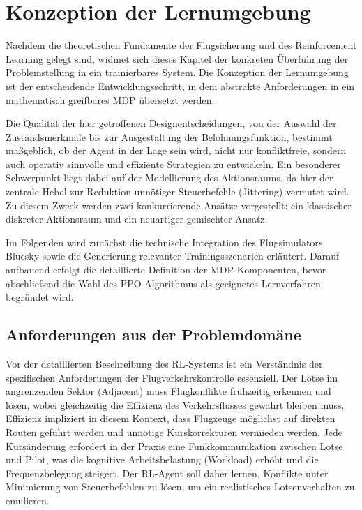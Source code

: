 \chapter{Konzeption der Lernumgebung}
\label{ch:konzeption}

Nachdem die theoretischen Fundamente der Flugsicherung und des Reinforcement Learning gelegt sind, widmet sich dieses Kapitel der konkreten Überführung der Problemstellung in ein trainierbares System. Die Konzeption der Lernumgebung ist der entscheidende Entwicklungsschritt, in dem abstrakte Anforderungen in ein mathematisch greifbares \ac{MDP} übersetzt werden.
\medskip

Die Qualität der hier getroffenen Designentscheidungen, von der Auswahl der Zustandsmerkmale bis zur Ausgestaltung der Belohnungsfunktion, bestimmt maßgeblich, ob der Agent in der Lage sein wird, nicht nur konfliktfreie, sondern auch operativ sinnvolle und effiziente Strategien zu entwickeln. Ein besonderer Schwerpunkt liegt dabei auf der Modellierung des Aktionsraums, da hier der zentrale Hebel zur Reduktion unnötiger Steuerbefehle (Jittering) vermutet wird. Zu diesem Zweck werden zwei konkurrierende Ansätze vorgestellt: ein klassischer diskreter Aktionsraum und ein neuartiger gemischter Ansatz.
\medskip

Im Folgenden wird zunächst die technische Integration des Flugsimulators Bluesky sowie die Generierung relevanter Trainingsszenarien erläutert. Darauf aufbauend erfolgt die detaillierte Definition der \ac{MDP}-Komponenten, bevor abschließend die Wahl des \ac{PPO}-Algorithmus als geeignetes Lernverfahren begründet wird.

\section{Anforderungen aus der Problemdomäne}
Vor der detaillierten Beschreibung des \ac{RL}\hyp{}Systems ist ein Verständnis der spezifischen Anforderungen der Flugverkehrskontrolle essenziell. 
Der Lotse im angrenzenden Sektor (Adjacent) muss Flugkonflikte frühzeitig erkennen und lösen, wobei gleichzeitig die Effizienz des Verkehrsflusses gewahrt bleiben muss.
Effizienz impliziert in diesem Kontext, dass Flugzeuge möglichst auf direkten Routen geführt werden und unnötige Kurskorrekturen vermieden werden.
Jede Kursänderung erfordert in der Praxis eine Funkkommunikation zwischen Lotse und Pilot, was die kognitive Arbeitsbelastung (Workload) erhöht und die Frequenzbelegung steigert.
Der \ac{RL}\hyp{}Agent soll daher lernen, Konflikte unter Minimierung von Steuerbefehlen zu lösen, um ein realistisches Lotsenverhalten zu emulieren.

